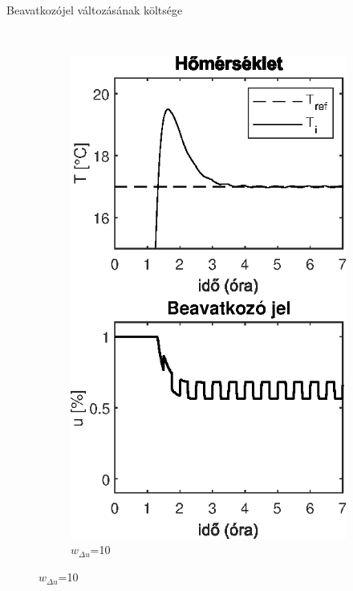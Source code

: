 \documentclass[14pt,handout]{beamer}
\begin{document}
\begin{frame}{Beavatkozójel változásának költsége}
\begin{figure}
~
\begin{subfigure}[t]{0.35\textwidth}
	\centering
	\includegraphics[width=\textwidth]{picture/mpc-wdu-10.eps}	
	\caption{$w_{\Delta u}$=10}	
\end{subfigure}
\end{figure}

\end{frame}
\end{document}
